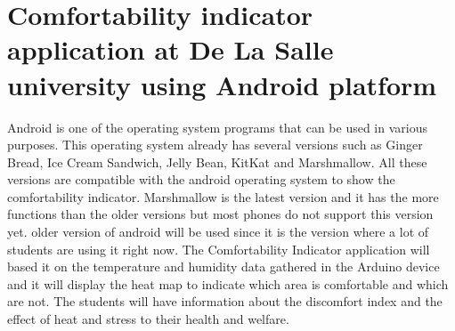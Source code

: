 \section{Comfortability indicator application at De La Salle university using Android platform}
Android is one of the operating system programs that can be used in various purposes. This operating system already has several versions such as Ginger Bread, Ice Cream Sandwich, Jelly Bean, KitKat and Marshmallow. All these versions are compatible with the android operating system to show the comfortability indicator. Marshmallow is the latest version and it has the more functions than the older versions but most phones do not support this version yet. older version of android will be used since it is the version where a lot of students are using it right now. 
The Comfortability Indicator application will based it on the temperature and humidity data gathered in the Arduino device and it will display the heat map to indicate which area is comfortable and which are not. The students will have information about the discomfort index and the effect of heat and stress to their health and welfare.
